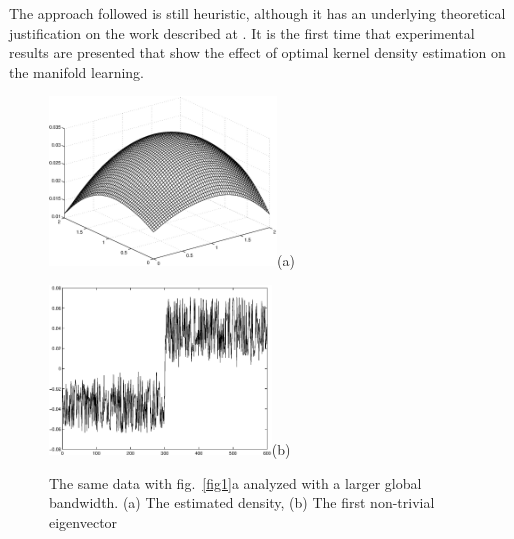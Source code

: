 \documentclass[12pt,letterpaper,doublespaced,ETD,dvips,proposal]{gtthesis}
\begin{document}
\begin{Body}
The approach followed is still  heuristic, although it has  an
underlying theoretical justification on the work described at
\cite{jenssen17lpd}. It is the first time that experimental results
are presented that show the effect of optimal kernel density
estimation on the manifold learning.


\begin{figure}[!htb]
  \centerline{\includegraphics[height=4.5cm]{fig1.1b.eps}(a)}
  \centerline{\includegraphics[height=4.5cm]{fig1.1c.eps}(b)}
  \caption{The same data with fig.~\ref{fig1}a analyzed with a
  larger global bandwidth. (a) The estimated density, (b) The first
  non-trivial eigenvector }
  \label{fig1.1}
\end{figure}



\end{Body}
\end{document}

